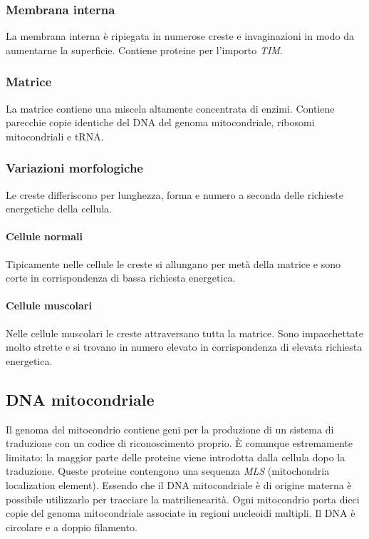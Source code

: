 		\subsubsection{Membrana interna}
		La membrana interna \`e ripiegata in numerose creste e invaginazioni in modo da aumentarne la superficie.
		Contiene proteine per l'importo \emph{TIM}.

		\subsubsection{Matrice}
		La matrice contiene una miscela altamente concentrata di enzimi.
		Contiene parecchie copie identiche del DNA del genoma mitocondriale, ribosomi mitocondriali e tRNA.

		\subsubsection{Variazioni morfologiche}
		Le creste differiscono per lunghezza, forma e numero a seconda delle richieste energetiche della cellula.

			\paragraph{Cellule normali}
			Tipicamente nelle cellule le creste si allungano per met\`a della matrice e sono corte in corrispondenza di bassa richiesta energetica.

			\paragraph{Cellule muscolari}
			Nelle cellule muscolari le creste attraversano tutta la matrice.
			Sono impacchettate molto strette e si trovano in numero elevato in corrispondenza di elevata richiesta energetica.

	\subsection{DNA mitocondriale}
	Il genoma del mitocondrio contiene geni per la produzione di un sistema di traduzione con un codice di riconoscimento proprio.
	\`E comunque estremamente limitato: la maggior parte delle proteine viene introdotta dalla cellula dopo la traduzione.
	Queste proteine contengono una sequenza \emph{MLS} (mitochondria localization element).
	Essendo che il DNA mitocondriale \`e di origine materna \`e possibile utilizzarlo per tracciare la matrilienearit\`a.
	Ogni mitocondrio porta dieci copie del genoma mitocondriale associate in regioni nucleoidi multipli.
	Il DNA \`e circolare e a doppio filamento.
